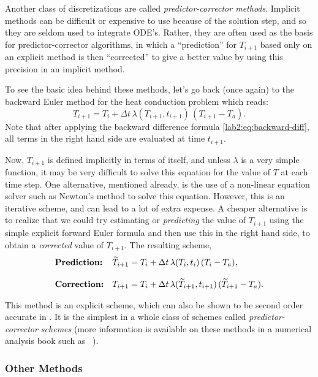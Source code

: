 Another class of discretizations are called \emph{ predictor-corrector
  methods}.  
Implicit methods can be difficult or expensive to use because of the
solution step, and so they are seldom used to integrate ODE's.
Rather, they are often used as the basis for predictor-corrector
algorithms, in which a ``prediction'' for $T_{i+1}$ based only on an
explicit method is then ``corrected'' to give a better value by using
this precision in an implicit method.  

To see the basic idea behind these methods, let's go back (once
again) to the backward Euler method for the heat conduction problem
which reads:
\[ 
T_{i+1} = T_{i} + \Delta t \, \lambda( T_{i+1}, t_{i+1} ) \, ( T_{i+1}
- T_a ).
\]
Note that after applying the backward difference formula
\eqref{lab2:eq:backward-diff}, all terms in the right hand side are
evaluated at time $t_{i+1}$.  

Now, $T_{i+1}$ is defined implicitly in terms of itself, and unless
$\lambda$ is a very simple function, it may be very difficult to
solve this equation for the value of $T$ at each time step.  One
alternative, mentioned already, is the use of a non-linear equation
solver such as Newton's method to solve this equation.  However,
this is an iterative scheme, and can lead to a lot of extra
expense.  A cheaper alternative is to realize that we could try
estimating or \emph{ predicting} the value of $T_{i+1}$ using the
simple explicit forward Euler formula and then use this in the right
hand side, to obtain a \emph{ corrected} value of $T_{i+1}$.  The
resulting scheme,
\[
\begin{array}{ll}
  \mbox{\rm\bf Prediction:} & \widetilde{T}_{i+1} = T_i + \mbox{$\Delta t$}{} \,
  \lambda(T_i,t_i) \, (T_i-T_a), \\ \; \\
  \mbox{\rm\bf Correction:} & T_{i+1} = T_i + \mbox{$\Delta t$}{} \,
  \lambda(\widetilde{T}_{i+1},t_{i+1}) \, (\widetilde{T}_{i+1}-T_a).
\end{array}
\]

This method is an explicit scheme, which can also be
shown to be second order accurate in \dt.  It is the simplest in a
whole class of schemes called \emph{ predictor-corrector schemes} (more
information is available on these methods in a numerical analysis book
such as ~\cite{burden-faires}).

\subsubsection{Other Methods}
\label{lab2:sec:other-methods}

